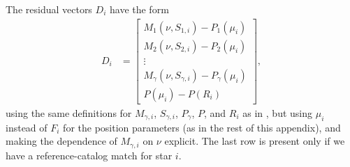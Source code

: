 The residual vectors $D_i$ have the form
\begin{align}
    D_i &= \left[
        \begin{array}{ c }
            M_1\left(\nu, S_{1,i}\right) - P_1\left(\mu_i\right) \\
            M_2\left(\nu, S_{2,i}\right) - P_2\left(\mu_i\right) \\
            \vdots \\
            M_{\gamma}\left(\nu, S_{\gamma,i}\right) - P_{\gamma}\left(\mu_i\right) \\
            P\left(\mu_i\right) - P\left(R_i\right)
        \end{array}
    \right],
\end{align}
using the same definitions for $M_{\gamma,i}$, $S_{\gamma,i}$, $P_{\gamma}$, $P$, and $R_i$ as in , but using $\mu_i$ instead of $F_i$ for the position parameters (as in the rest of this appendix), and making the dependence of $M_{\gamma,i}$ on $\nu$ explicit.
The last row is present only if we have a reference-catalog match for star $i$.

